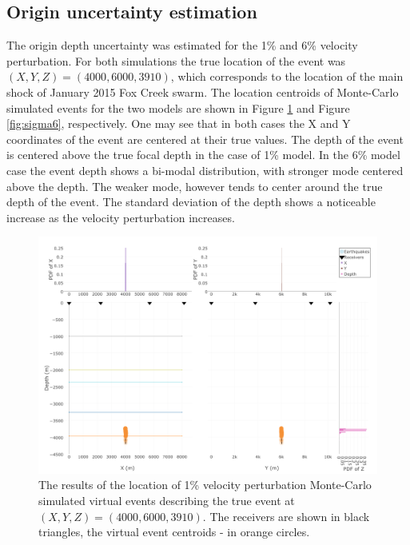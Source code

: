 \subsection{Origin uncertainty estimation}
The origin depth uncertainty was estimated for the 1\% and 6\% velocity perturbation. For both simulations the true location of the event was $(X,Y,Z) = (4000,6000,3910)$, which corresponds to the location of the main shock of January 2015 Fox Creek swarm. The location centroids of Monte-Carlo simulated events for the two models are shown in Figure \ref{fig:sigma1} and Figure \ref{fig:sigma6}, respectively. One may see that in both cases the X and Y coordinates of the event are centered at their true values. The depth of the event is centered above the true focal depth in the case of 1\% model. In the 6\% model case the event depth shows a bi-modal distribution, with stronger mode centered above the depth. The weaker mode, however tends to center around the true depth of the event. The standard deviation of the depth shows a noticeable increase as the velocity perturbation increases.
\begin{figure}[htb]
\begin{center}
\includegraphics[width=0.85\linewidth,angle=0]{./AntonBiryukov_bibtex/Figure1_1pct.png}
\end{center}
\vspace{-4mm}
\caption{The results of the location of 1\% velocity perturbation Monte-Carlo simulated virtual events describing the true event at $(X,Y,Z) = (4000,6000,3910)$. The receivers are shown in black triangles, the virtual event centroids - in orange circles.}
\label{fig:sigma1}
\end{figure}

